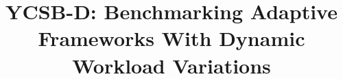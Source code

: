 \documentclass[conference]{IEEEtran}
\begin{document}

\title{YCSB-D: Benchmarking Adaptive Frameworks With Dynamic Workload Variations}



%
%
%
%
\end{document}
